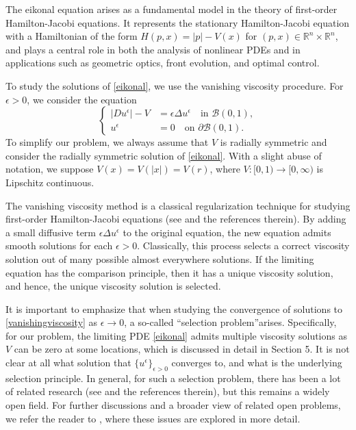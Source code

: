 \documentclass[12pt,reqno]{amsart}
\numberwithin{figure}{section}
\theoremstyle{plain}
\numberwithin{equation}{section}
\newcommand{\R}{\mathbb{R}}
\newcommand{\cB}{\mathcal{B}}
\begin{document}
The eikonal equation arises as a fundamental model in the theory of first-order Hamilton-Jacobi equations. It represents the stationary Hamilton-Jacobi equation with a Hamiltonian of the form $H(p,x)=|p|-V(x)$ for $(p,x)\in \R^n\times \R^n$, and plays a central role in both the analysis of nonlinear PDEs and in applications such as geometric optics, front evolution, and optimal control. 

To study the solutions of \eqref{eikonal}, we use the vanishing viscosity procedure. For $\epsilon>0$, we consider the equation
\begin{equation}\label{vanishingviscosity}
\left\{
\begin{aligned}
    |Du^{\epsilon}|-V &= \epsilon \Delta u^\epsilon \quad \text{in } \cB(0,1), \\
    u^\epsilon &=0 \quad \text{on } \partial \cB(0,1).   
\end{aligned}
\right.
\end{equation}
To simplify our problem, we always assume that $V$ is radially symmetric and consider the radially symmetric solution of \eqref{eikonal}.
With a slight abuse of notation, we suppose $V(x)=V(|x|)=V(r)$, where $V: [0,1) \rightarrow [0,\infty)$ is Lipschitz continuous. 

The vanishing viscosity method is a classical regularization technique for studying first-order Hamilton-Jacobi equations (see \cite{CrandallLions1983, CrandallEvansLions1984, Tran2021} and the references therein). By adding a small diffusive term $\epsilon \Delta u^{\epsilon}$ to the original equation, the new equation admits smooth solutions for each $\epsilon>0$. Classically, this process selects a correct viscosity solution out of many possible almost everywhere solutions. If the limiting equation has the comparison principle, then it has a unique viscosity solution, and hence, the unique viscosity solution is selected. 

     It is important to emphasize that when studying the convergence of solutions to \eqref{vanishingviscosity} as $\epsilon \to 0$, a so-called  ``selection problem''arises. Specifically, for our problem, the limiting PDE \eqref{eikonal} admits multiple viscosity solutions as $V$ can be zero at some locations, which is discussed in detail in Section 5. It is not clear at all what solution that $\{u^{\epsilon} \}_{\epsilon>0}$ converges to, and what is the underlying selection principle. In general, for such a selection problem, there has been a lot of related research (see \cite{Bessi, Gomes2003, Evans, AIPS, Yu, Gomes2008, Cagnetti2011, ishii2017vanishing, ishii2017boundary, TuZhang} and the references therein), but this remains a widely open field. For further discussions and a broader view of related open problems, we refer the reader to \cite[Section 6.6]{LeMitakeTran2017}, where these issues are explored in more detail.
\end{document}
